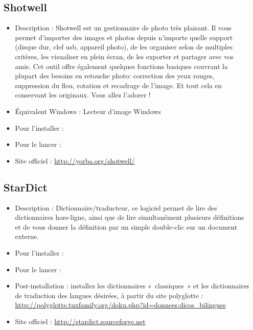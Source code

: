\subsection{Shotwell}
\begin{itemize}
\begingroup
{}
\item Description : Shotwell est un gestionnaire de photo très plaisant. Il vous permet d'importer des images et photos depuis n'importe quelle support (disque dur, clef usb, appareil photo), de les organiser selon de multiples critères, les visualiser en plein écran, de les exporter et partager avec vos amis. Cet outil offre également quelques fonctions basiques couvrant la plupart des besoins en retouche photo: correction des yeux rouges, suppression du flou, rotation et recadrage de l'image. Et tout cela en conservant les originaux. Vous allez l'adorer !{\par}
\item Équivalent Windows : Lecteur d'image Windows{\par}
\item Pour l'installer : 
\item Pour le lancer : 
\item Site officiel : \url{http://yorba.org/shotwell/}{\par}
\endgroup
\end{itemize}

\newpage
\subsection{StarDict}
\begin{itemize}
\begingroup
{}
\item Description : Dictionnaire/traducteur, ce logiciel permet de lire des dictionnaires hors-ligne, ainsi que de lire simultanément plusieurs définitions et de vous donner la définition par un simple double-clic sur un document externe.{\par}
\item Pour l'installer : 
\item Pour le lancer : 
\item Post-installation : installez les dictionnaires «~classiques~» et les dictionnaires de traduction des langues désirées, à partir du site polyglotte : \url{http://polyglotte.tuxfamily.org/doku.php?id=donnees:dicos_bilingues}{\par}
\item Site officiel : \url{http://stardict.sourceforge.net}{\par}
\endgroup
\end{itemize}

